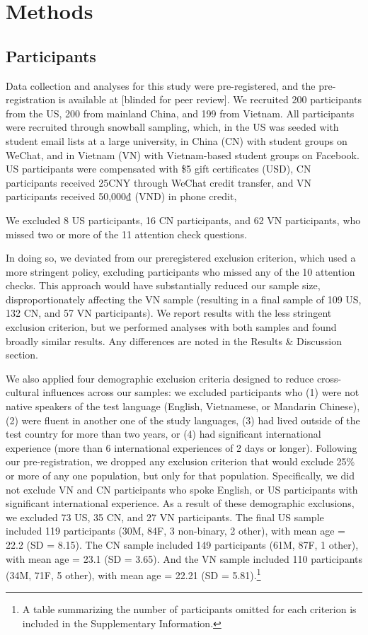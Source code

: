 \documentclass[10pt, letterpaper]{article}
\begin{document}
\hypertarget{methods}{%
\section{Methods}\label{methods}}

\hypertarget{participants}{%
\subsection{Participants}\label{participants}}

Data collection and analyses for this study were pre-registered, and the
pre-registration is available at {[}blinded for peer review{]}. We
recruited 200 participants from the US, 200 from mainland China, and 199
from Vietnam. All participants were recruited through snowball sampling,
which, in the US was seeded with student email lists at a large
university, in China (CN) with student groups on WeChat, and in Vietnam
(VN) with Vietnam-based student groups on Facebook. US participants were
compensated with \$5 gift certificates (USD), CN participants received
25CNY through WeChat credit transfer, and VN participants received
50,000₫ (VND) in phone credit,

We excluded 8 US participants, 16 CN participants, and 62 VN
participants, who missed two or more of the 11 attention check
questions.

In doing so, we deviated from our preregistered exclusion criterion,
which used a more stringent policy, excluding participants who missed
any of the 10 attention checks. This approach would have substantially
reduced our sample size, disproportionately affecting the VN sample
(resulting in a final sample of 109 US, 132 CN, and 57 VN participants).
We report results with the less stringent exclusion criterion, but we
performed analyses with both samples and found broadly similar results.
Any differences are noted in the Results \& Discussion section.

We also applied four demographic exclusion criteria designed to reduce
cross-cultural influences across our samples: we excluded participants
who (1) were not native speakers of the test language (English,
Vietnamese, or Mandarin Chinese), (2) were fluent in another one of the
study languages, (3) had lived outside of the test country for more than
two years, or (4) had significant international experience (more than 6
international experiences of 2 days or longer). Following our
pre-registration, we dropped any exclusion criterion that would exclude
25\% or more of any one population, but only for that population.
Specifically, we did not exclude VN and CN participants who spoke
English, or US participants with significant international experience.
As a result of these demographic exclusions, we excluded 73 US, 35 CN,
and 27 VN participants. The final US sample included 119 participants
(30M, 84F, 3 non-binary, 2 other), with mean age = 22.2 (SD = 8.15). The
CN sample included 149 participants (61M, 87F, 1 other), with mean age =
23.1 (SD = 3.65). And the VN sample included 110 participants (34M, 71F,
5 other), with mean age = 22.21 (SD = 5.81).\footnote{A table
  summarizing the number of participants omitted for each criterion is
  included in the Supplementary Information.}
\end{document}

